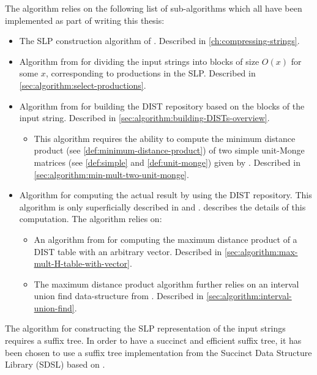 \documentclass[twoside,11pt,openright]{report}
\begin{document}
The algorithm relies on the following list of sub-algorithms which all have been implemented as part of writing this thesis:
\begin{itemize}
  \item The SLP construction algorithm of \cite{Rytter2003211}. Described in \cref{ch:compressing-strings}.
  \item Algorithm from \cite{DBLP:journals/corr/abs-1004-1194} for dividing the input strings into blocks of size $O(x)$ for some $x$, corresponding to productions in the SLP. Described in \cref{sec:algorithm:select-productions}.
  \item Algorithm from \cite{DBLP:journals/corr/abs-1004-1194} for building the DIST repository based on the blocks of the input string. Described in \cref{sec:algorithm:building-DISTs-overview}.
    \begin{itemize}
      \item This algorithm requires the ability to compute the minimum distance product (see \cref{def:minimum-distance-product}) of two simple unit-Monge matrices (see \cref{def:simple} and \cref{def:unit-monge}) given by \cite{Tiskin:2010:FDM:1873601.1873704}. Described in \cref{sec:algorithm:min-mult-two-unit-monge}.
    \end{itemize}
  \item Algorithm for computing the actual result by using the DIST repository. This algorithm is only superficially described in \cite{Gawrychowski:2012:FAC:2422024.2422048} and \cite{DBLP:journals/corr/abs-0707-3619}.  describes the details of this computation. The algorithm relies on:
    \begin{itemize}
      \item An algorithm from \cite{Gawrychowski:2012:FAC:2422024.2422048} for computing the maximum distance product of a DIST table with an arbitrary vector. Described in \cref{sec:algorithm:max-mult-H-table-with-vector}.
      \item The maximum distance product algorithm further relies on an interval union find data-structure from \cite{Itai06lineartime}. Described in \cref{sec:algorithm:interval-union-find}.
    \end{itemize}
\end{itemize}
The algorithm for constructing the SLP representation of the input strings requires a suffix tree. In order to have a succinct and efficient suffix tree, it has been chosen to use a suffix tree implementation from the Succinct Data Structure Library (SDSL) \cite{SDSL} based on \cite{OHL:FIS:GOG:2010}.
\end{document}
